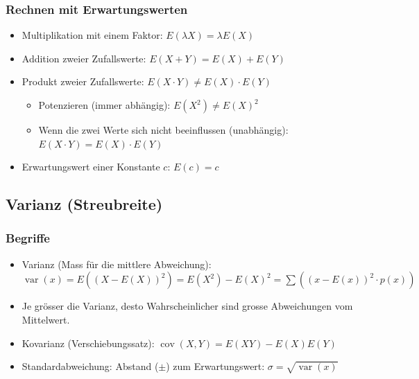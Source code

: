 \subsubsection{Rechnen mit Erwartungswerten}
\begin{itemize}
  \item Multiplikation mit einem Faktor: $E(\lambda X) = \lambda E(X)$
  \item Addition zweier Zufallswerte: $E(X + Y) = E(X) + E(Y)$
  \item Produkt zweier Zufallswerte: $E(X \cdot Y) \ne E(X) \cdot E(Y)$
  \begin{itemize}
    \item Potenzieren (immer abhängig): $E(X^2) \ne E(X)^2$
    \item Wenn die zwei Werte sich nicht beeinflussen
      (unabhängig): $E(X \cdot Y) = E(X) \cdot E(Y)$
  \end{itemize}
  \item Erwartungswert einer Konstante $c$: $E(c) = c$
\end{itemize}

\subsection{Varianz (Streubreite)}
\subsubsection{Begriffe}
\begin{itemize}
  \item Varianz (Mass für die mittlere Abweichung):
    $\operatorname{var}(x) = E((X - E(X))^2) = E(X^2) - E(X)^2 =
    \sum((x-E(x))^2 \cdot p(x))$
  \item Je grösser die Varianz, desto Wahrscheinlicher sind grosse
    Abweichungen vom Mittelwert.
  \item Kovarianz (Verschiebungssatz):
    $\operatorname{cov}(X,Y) = E(XY) - E(X)E(Y)$
  \item Standardabweichung: Abstand ($\pm$) zum Erwartungswert:
    $\sigma = \sqrt{\operatorname{var}(x)}$
\end{itemize}
